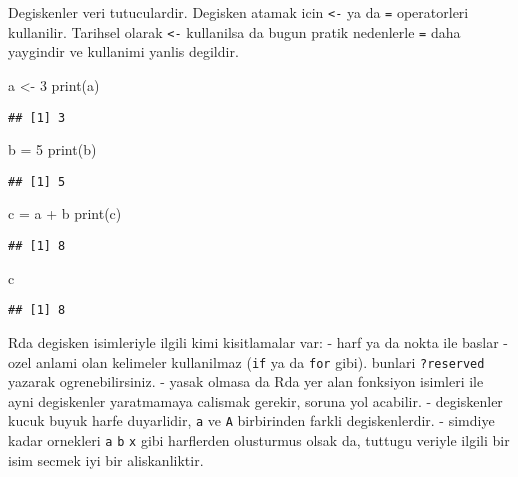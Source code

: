\documentclass[
]{book}
\newenvironment{Shaded}{\begin{snugshade}}{\end{snugshade}}
\newcommand{\DecValTok}[1]{\textcolor[rgb]{0.00,0.00,0.81}{#1}}
\newcommand{\FunctionTok}[1]{\textcolor[rgb]{0.00,0.00,0.00}{#1}}
\newcommand{\NormalTok}[1]{#1}
\newcommand{\OtherTok}[1]{\textcolor[rgb]{0.56,0.35,0.01}{#1}}
\newcommand{\SpecialCharTok}[1]{\textcolor[rgb]{0.00,0.00,0.00}{#1}}
\begin{document}
Degiskenler veri tutuculardir. Degisken atamak icin \texttt{\textless{}-} ya da \texttt{=} operatorleri kullanilir. Tarihsel olarak \texttt{\textless{}-} kullanilsa da bugun pratik nedenlerle \texttt{=} daha yaygindir ve kullanimi yanlis degildir.

\begin{Shaded}
\begin{Highlighting}[]
\NormalTok{a }\OtherTok{\textless{}{-}} \DecValTok{3}
\FunctionTok{print}\NormalTok{(a)}
\end{Highlighting}
\end{Shaded}

\begin{verbatim}
## [1] 3
\end{verbatim}

\begin{Shaded}
\begin{Highlighting}[]
\NormalTok{b }\OtherTok{=} \DecValTok{5}
\FunctionTok{print}\NormalTok{(b)}
\end{Highlighting}
\end{Shaded}

\begin{verbatim}
## [1] 5
\end{verbatim}

\begin{Shaded}
\begin{Highlighting}[]
\NormalTok{c }\OtherTok{=}\NormalTok{ a }\SpecialCharTok{+}\NormalTok{ b}
\FunctionTok{print}\NormalTok{(c)}
\end{Highlighting}
\end{Shaded}

\begin{verbatim}
## [1] 8
\end{verbatim}

\begin{Shaded}
\begin{Highlighting}[]
\NormalTok{c}
\end{Highlighting}
\end{Shaded}

\begin{verbatim}
## [1] 8
\end{verbatim}

Rda degisken isimleriyle ilgili kimi kisitlamalar var:
- harf ya da nokta ile baslar
- ozel anlami olan kelimeler kullanilmaz (\texttt{if} ya da \texttt{for} gibi). bunlari \texttt{?reserved} yazarak ogrenebilirsiniz.
- yasak olmasa da Rda yer alan fonksiyon isimleri ile ayni degiskenler yaratmamaya calismak gerekir, soruna yol acabilir.
- degiskenler kucuk buyuk harfe duyarlidir, \texttt{a} ve \texttt{A} birbirinden farkli degiskenlerdir.
- simdiye kadar ornekleri \texttt{a} \texttt{b} \texttt{x} gibi harflerden olusturmus olsak da, tuttugu veriyle ilgili bir isim secmek iyi bir aliskanliktir.
\end{document}
